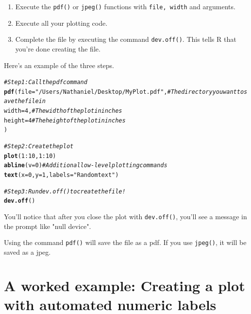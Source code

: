 \documentclass{tufte-book}\usepackage[]{graphicx}\usepackage[]{color}
\makeatletter
\newcommand{\hlnum}[1]{\textcolor[rgb]{0.686,0.059,0.569}{#1}}%
\newcommand{\hlstr}[1]{\textcolor[rgb]{0.192,0.494,0.8}{#1}}%
\newcommand{\hlcom}[1]{\textcolor[rgb]{0.678,0.584,0.686}{\textit{#1}}}%
\newcommand{\hlopt}[1]{\textcolor[rgb]{0,0,0}{#1}}%
\newcommand{\hlstd}[1]{\textcolor[rgb]{0.345,0.345,0.345}{#1}}%
\newcommand{\hlkwc}[1]{\textcolor[rgb]{0.333,0.667,0.333}{#1}}%
\newcommand{\hlkwd}[1]{\textcolor[rgb]{0.737,0.353,0.396}{\textbf{#1}}}%
\newenvironment{kframe}{%
 \def\at@end@of@kframe{}%
 \ifinner\ifhmode%
  \def\at@end@of@kframe{\end{minipage}}%
  \begin{minipage}{\columnwidth}%
 \fi\fi%
 \def\FrameCommand##1{\hskip\@totalleftmargin \hskip-\fboxsep
 \colorbox{shadecolor}{##1}\hskip-\fboxsep
     \hskip-\linewidth \hskip-\@totalleftmargin \hskip\columnwidth}%
 \MakeFramed {\advance\hsize-\width
   \@totalleftmargin\z@ \linewidth\hsize
   \@setminipage}}%
 {\par\unskip\endMakeFramed%
 \at@end@of@kframe}
\newenvironment{knitrout}{}{} %
\makeatother
\begin{document}
\begin{enumerate}
  \item Execute the \texttt{pdf()} or \texttt{jpeg()} functions with \texttt{file, width} and  arguments.
  \item Execute all your plotting code.
  \item Complete the file by executing the command \texttt{dev.off()}. This tells R that you're done creating the file.
\end{enumerate}

Here's an example of the three steps.


\begin{knitrout}
\color{fgcolor}\begin{kframe}
\begin{alltt}
\hlcom{# Step 1: Call the pdf command}
\hlkwd{pdf}\hlstd{(}\hlkwc{file} \hlstd{=} \hlstr{"/Users/Nathaniel/Desktop/My Plot.pdf"}\hlstd{,}   \hlcom{# The directory you want to save the file in}
    \hlkwc{width} \hlstd{=} \hlnum{4}\hlstd{,} \hlcom{# The width of the plot in inches}
    \hlkwc{height} \hlstd{=} \hlnum{4} \hlcom{# The height of the plot in inches}
    \hlstd{)}

\hlcom{# Step 2: Create the plot}
\hlkwd{plot}\hlstd{(}\hlnum{1}\hlopt{:}\hlnum{10}\hlstd{,} \hlnum{1}\hlopt{:}\hlnum{10}\hlstd{)}
\hlkwd{abline}\hlstd{(}\hlkwc{v} \hlstd{=} \hlnum{0}\hlstd{)} \hlcom{# Additional low-level plotting commands}
\hlkwd{text}\hlstd{(}\hlkwc{x} \hlstd{=} \hlnum{0}\hlstd{,} \hlkwc{y} \hlstd{=} \hlnum{1}\hlstd{,} \hlkwc{labels} \hlstd{=} \hlstr{"Random text"}\hlstd{)}

\hlcom{# Step 3: Run dev.off() to create the file!}
\hlkwd{dev.off}\hlstd{()}
\end{alltt}
\end{kframe}
\end{knitrout}


You'll notice that after you close the plot with \texttt{dev.off()}, you'll see a message in the prompt like "null device".

Using the command  \texttt{pdf()} will save the file as a pdf. If you use  \texttt{jpeg()}, it will be saved as a jpeg.


\section{A worked example: Creating a plot with automated numeric labels}
\end{document}
